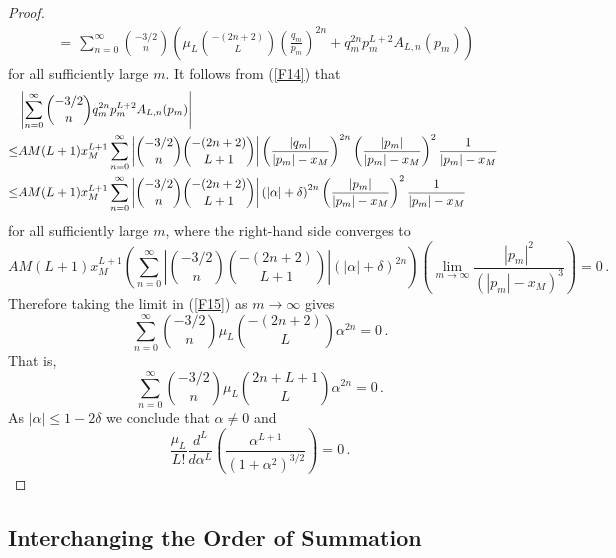 \documentclass{article}
\theoremstyle{remark}
\numberwithin{equation}{section}
\begin{document}
\begin{proof}
\begin{equation}
\begin{split}
& = \, \sum_{n=0}^\infty{\binom {-3/2}{n} \left( \mu_L \binom{-(2n+2)}{L} \left( \frac{q_m}{p_m} \right)^{2n} + q_m^{2n}p_m^{L+2}A_{L,n}(p_m) \right)}
\end{split} \end{equation}
for all sufficiently large $m$. It follows from (\ref{F14}) that
\begin{equation} \notag \begin{split}
&  \left| \sum_{n=0}^\infty{\binom {-3/2}{n} q_m^{2n}p_m^{L+2}A_{L,n}(p_m)} \right| \cr
\leq & AM(L+1)x_M^{L+1} \sum_{n=0}^\infty{ \left| \binom {-3/2}{n} \binom{-(2n+2)}{L+1} \right| \left( \frac{|q_m|}{|p_m|-x_M} \right)^{2n}
\left( \frac{|p_m|}{|p_m|-x_M} \right)^2 \frac{1}{|p_m| - x_M}} \cr
\leq & AM(L+1)x_M^{L+1} \sum_{n=0}^\infty{ \left| \binom {-3/2}{n} \binom{-(2n+2)}{L+1} \right| \left( |\alpha| + \delta \right)^{2n}}
\left( \frac{|p_m|}{|p_m|-x_M} \right)^2 \frac{1}{|p_m| -x_M}\cr
\end{split} \end{equation}
for all sufficiently large $m$, where the right-hand side converges to
$$AM(L+1)x_M^{L+1} \left( \sum_{n=0}^\infty{ \left| \binom {-3/2}{n} \binom{-(2n+2)}{L+1} \right| \left( |\alpha| + \delta \right)^{2n}} \right)
\left( \lim_{m \rightarrow \infty}{\frac{|p_m|^2}{(|p_m|-x_M)^3}} \right) = 0\,.$$
Therefore taking the limit in (\ref{F15}) as $m \rightarrow \infty$ gives
$$\sum_{n=0}^\infty{\binom{-3/2}{n} \mu_L \binom{-(2n+2)}{L} \alpha^{2n}} = 0\,.$$
That is,
$$\sum_{n=0}^\infty{\binom{-3/2}{n} \mu_L \binom{2n+L+1}{L} \alpha^{2n}} = 0\,.$$
As $|\alpha| \leq 1-2\delta$ we conclude that $\alpha \neq 0$ and
$$\frac{\mu_L}{L!} \frac{d^L}{d\alpha^L} \left( \frac{\alpha^{L+1}}{(1+\alpha^2)^{3/2}} \right) = 0\,.$$
\end{proof}

\subsection{Interchanging the Order of Summation}\label{interchange}
\end{document}
